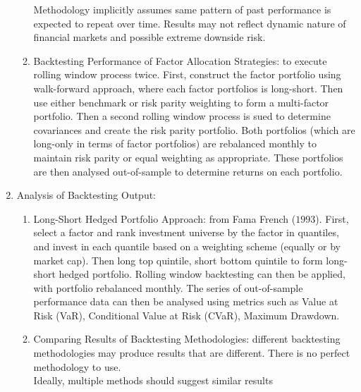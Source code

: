 \begin{method}
\begin{enumerate}[label=\roman*.]
\begin{enumerate}[label=\arabic*.]
Methodology implicitly assumes same pattern of past performance is expected to repeat over time. Results may not reflect dynamic nature of financial markets and possible extreme downside risk.
\item Backtesting Performance of Factor Allocation Strategies: to execute rolling window process twice. First, construct the factor portfolio using walk-forward approach, where each factor portfolios is long-short. Then use either benchmark or risk parity weighting to form a multi-factor portfolio. Then a second rolling window process is sued to determine covariances and create the risk parity portfolio. Both portfolios (which are long-only in terms of factor portfolios) are rebalanced monthly to maintain risk parity or equal weighting as appropriate. These portfolios are then analysed out-of-sample to determine returns on each portfolio.
\end{enumerate}
\item Analysis of Backtesting Output:
\begin{enumerate}[label=\arabic*.]
\setlength{\itemsep}{0pt}
\item Long-Short Hedged Portfolio Approach: from Fama French ($1993$). First, select a factor and rank investment universe by the factor in quantiles, and invest in each quantile based on a weighting scheme (equally or by market cap). Then long top quintile, short bottom quintile to form long-short hedged portfolio. Rolling window backtesting can then be applied, with portfolio rebalanced monthly. The series of out-of-sample performance data can then be analysed using metrics such as Value at Risk (VaR), Conditional Value at Risk (CVaR), Maximum Drawdown.
\item Comparing Results of Backtesting Methodologies: different backtesting methodologies may produce results that are different. There is no perfect methodology to use.\\
Ideally, multiple methods should suggest similar results
\end{enumerate}
\end{enumerate}
\end{method}

